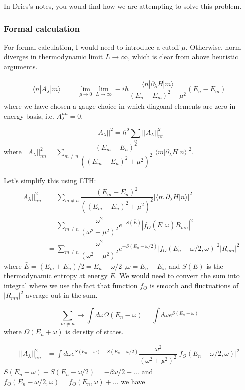 \documentclass[11pt,a4paper]{article}
\begin{document}
In Dries's notes, you would find how we are attempting to solve this problem.

\subsubsection{Formal calculation}
For formal calculation, I would need to introduce a cutoff $\mu$. Otherwise, norm diverges in thermodynamic limit $L \rightarrow \infty$, which is clear from above heuristic arguments.

\begin{eqnarray}
\langle n | A_{\lambda} | m \rangle &=& \lim_{\mu \rightarrow 0} \lim_{L \rightarrow \infty } -i \hbar \dfrac{\langle n | \partial_{\lambda}H  | m \rangle}{(E_n-E_m)^2 + \mu^2} (E_n-E_m) 
\label{off-digonal}
\end{eqnarray}
where we have chosen a gauge choice in which diagonal elements are zero in energy basis, i.e. $A_{\lambda}^{nn}=0$. 

\begin{equation}
||A_{\lambda}||^2 = \hbar^2\sum_n ||A_{\lambda}||^2_{nn}
\end{equation}
where $||A_{\lambda}||^2_{nn} =\sum_{m \neq n}  \dfrac{(E_m-E_n)^2}{((E_m-E_n)^2 + \mu^2)^2} |\langle m | \partial_{\lambda}H| n \rangle|^2$.

Let's simplify this using ETH:
\begin{align*}
||A_{\lambda}||^2_{nn} &= \sum_{m \neq n}  \dfrac{(E_m-E_n)^2}{((E_m-E_n)^2 + \mu^2)^2} |\langle m | \partial_{\lambda}H| n \rangle|^2\\
&=\sum_{m \neq n}  \dfrac{\omega^2}{(\omega^2 + \mu^2)^2} e^{-S(\bar{E})} |f_O(\bar{E}, \omega) R_{mn}|^2\\
&=\sum_{m \neq n}  \dfrac{\omega^2}{(\omega^2 + \mu^2)^2} e^{-S(E_n -\omega/2)} |f_O(E_n - \omega/2, \omega)|^2 |R_{mn}|^2
\end{align*}
where $\bar{E}= (E_m +E_n)/2=E_n - \omega/2$ ,$ \omega= E_n- E_m$ and $S(E)$ is the thermodynamic entropy at energy $E$.
We would need to convert the sum into integral where we use the fact that function $f_O$ is smooth and fluctuations of $|R_{mn}|^2$ average out in the sum.

\begin{equation}
\sum_{m \neq n}  \rightarrow \int d \omega \Omega(E_{n}- \omega)= \int d \omega e^{S(E_{n}- \omega)}
\end{equation}
where $\Omega(E_{n}+ \omega)$ is density of states.


\begin{align*}
||A_{\lambda}||^2_{nn} &=\int d \omega e^{S(E_{n}- \omega)-S(E_n -\omega/2)} \dfrac{\omega^2}{(\omega^2 + \mu^2)^2}  |f_O(E_n - \omega/2, \omega)|^2 
\end{align*}
$S(E_{n}- \omega)-S(E_n -\omega/2) = -\beta \omega/2 + \ldots $ and $f_O(E_n - \omega/2, \omega)=f_O(E_n, \omega) + \ldots $ we have
\end{document}
